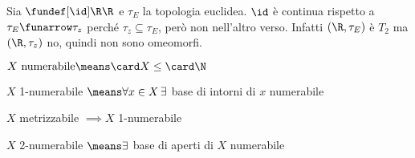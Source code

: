 \begin{es}
Sia $\fundef[\id]\R\R$ e $\tau_E$ la topologia euclidea. $\id$ è continua rispetto a $\tau_E\funarrow\tau_z$ perché $\tau_z\subseteq\tau_E$, però non nell'altro verso. Infatti $(\R,\tau_E)$ è $T_2$ ma $(\R,\tau_z)$ no, quindi non sono omeomorfi.
\end{es}

\begin{defn}[Numerabilità]
$X\text{ numerabile}\means\card X\leq\card\N$
\end{defn}

\begin{defn}
$X$ 1-numerabile $\means\forall x\in X\,\exists$ base di intorni di $x$ numerabile
\end{defn}

\begin{prop}
$X$ metrizzabile $\implies X$ 1-numerabile
\end{prop}

\begin{defn}
$X$ 2-numerabile $\means\exists$ base di aperti di $X$ numerabile
\end{defn}
